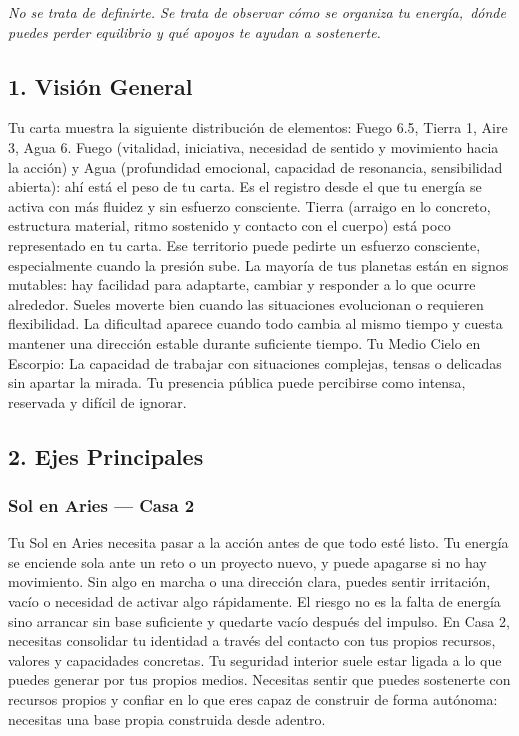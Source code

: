 \documentclass[11pt,a4paper]{article}\usepackage[utf8]{inputenc}
\begin{document}
\begin{center}
{\small\itshape
No se trata de definirte. Se trata de observar cómo se organiza tu energía,\
dónde puedes perder equilibrio y qué apoyos te ayudan a sostenerte.
}
\end{center}

\vspace{0.5cm}

\subsection{1. Visión General}

Tu carta muestra la siguiente distribución de elementos: Fuego 6.5, Tierra 1, Aire 3, Agua 6. Fuego (vitalidad, iniciativa, necesidad de sentido y movimiento hacia la acción) y Agua (profundidad emocional, capacidad de resonancia, sensibilidad abierta): ahí está el peso de tu carta. Es el registro desde el que tu energía se activa con más fluidez y sin esfuerzo consciente. Tierra (arraigo en lo concreto, estructura material, ritmo sostenido y contacto con el cuerpo) está poco representado en tu carta. Ese territorio puede pedirte un esfuerzo consciente, especialmente cuando la presión sube. La mayoría de tus planetas están en signos mutables: hay facilidad para adaptarte, cambiar y responder a lo que ocurre alrededor. Sueles moverte bien cuando las situaciones evolucionan o requieren flexibilidad. La dificultad aparece cuando todo cambia al mismo tiempo y cuesta mantener una dirección estable durante suficiente tiempo. Tu Medio Cielo en Escorpio: La capacidad de trabajar con situaciones complejas, tensas o delicadas sin apartar la mirada. Tu presencia pública puede percibirse como intensa, reservada y difícil de ignorar.

\vspace{0.8cm}

\subsection{2. Ejes Principales}

\subsubsection*{Sol en Aries — Casa 2}
Tu Sol en Aries necesita pasar a la acción antes de que todo esté listo. Tu energía se enciende sola ante un reto o un proyecto nuevo, y puede apagarse si no hay movimiento. Sin algo en marcha o una dirección clara, puedes sentir irritación, vacío o necesidad de activar algo rápidamente. El riesgo no es la falta de energía sino arrancar sin base suficiente y quedarte vacío después del impulso. En Casa 2, necesitas consolidar tu identidad a través del contacto con tus propios recursos, valores y capacidades concretas. Tu seguridad interior suele estar ligada a lo que puedes generar por tus propios medios. Necesitas sentir que puedes sostenerte con recursos propios y confiar en lo que eres capaz de construir de forma autónoma: necesitas una base propia construida desde adentro.
\end{document}
